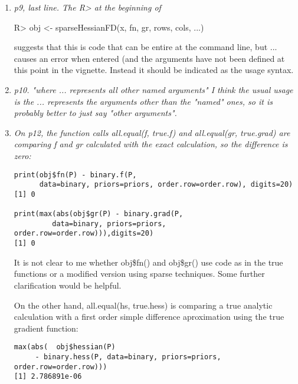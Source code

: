 \documentclass{article}
\newenvironment{revQuote}{\itshape}{\vspace{\baselineskip}}
\newenvironment{response}{\normalfont}{\vspace{\baselineskip}}
\begin{document}
\begin{enumerate}
\begin{response}
  
\end{response}


\item \begin{revQuote}
p9, last line. The R> at the beginning of
 
   R> obj <- sparseHessianFD(x, fn, gr, rows, cols, ...)

suggests that this is code that can be entire at the command line, but ...
causes an error when entered (and the arguments have not been defined at
this point in the vignette. Instead it should be indicated as the usage
syntax.
  \end{revQuote}

\begin{response}
  
\end{response}


\item \begin{revQuote}
p10. "where ... represents all other named arguments"
   I think the usual usage is the ... represents the arguments other than
the "named" ones, so it is probably better to just say "other arguments".
  \end{revQuote}

\begin{response}
  
\end{response}


\item \begin{revQuote}
On p12, the function calls all.equal(f, true.f) and all.equal(gr,
true.grad) are comparing f and gr calculated with the exact calculation, so
the difference is zero:

\begin{verbatim}
print(obj$fn(P) - binary.f(P, 
      data=binary, priors=priors, order.row=order.row), digits=20)
[1] 0

print(max(abs(obj$gr(P) - binary.grad(P, 
         data=binary, priors=priors,
order.row=order.row))),digits=20)
[1] 0

\end{verbatim}

It is not clear to me whether obj\$fn() and obj\$gr() use code as in the true
functions or a modified version using sparse techniques. Some further
clarification would be helpful.

On the other hand, all.equal(hs, true.hess) is comparing a true analytic
calculation with a first order simple difference aproximation using the true
gradient function:
\begin{verbatim}
max(abs(  obj$hessian(P)
     - binary.hess(P, data=binary, priors=priors, order.row=order.row)))
[1] 2.786891e-06
\end{verbatim}


\end{revQuote}
\end{enumerate}
\end{document}
